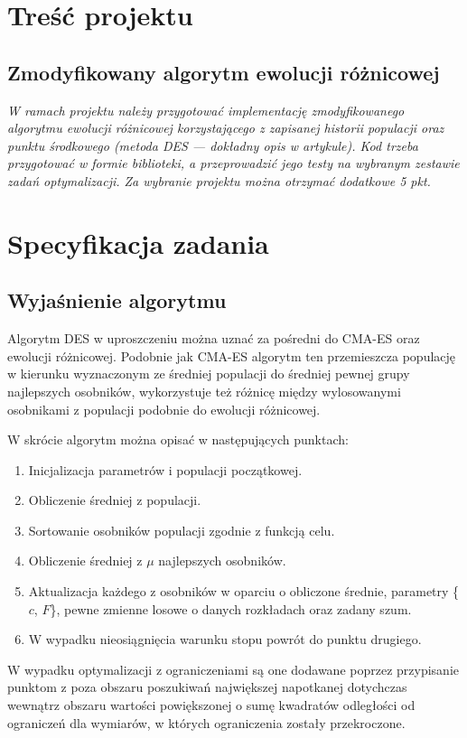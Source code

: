 \chapter{Treść projektu}
\section{Zmodyfikowany algorytm ewolucji różnicowej}
\textit{W ramach projektu należy przygotować implementację zmodyfikowanego algorytmu ewolucji różnicowej korzystającego z zapisanej historii populacji oraz punktu środkowego (metoda DES --- dokładny opis w artykule). Kod trzeba przygotować w formie biblioteki, a przeprowadzić jego testy na wybranym zestawie zadań optymalizacji. Za wybranie projektu można otrzymać dodatkowe 5 pkt.}

\chapter{Specyfikacja zadania}
\section{Wyjaśnienie algorytmu}
Algorytm DES w uproszczeniu można uznać za pośredni do CMA-ES oraz ewolucji różnicowej. Podobnie jak CMA-ES algorytm ten przemieszcza populację w kierunku wyznaczonym ze średniej populacji do średniej pewnej grupy najlepszych osobników, wykorzystuje też różnicę między wylosowanymi osobnikami z populacji podobnie do ewolucji różnicowej.

W skrócie algorytm można opisać w następujących punktach:

\begin{enumerate}
    \item Inicjalizacja parametrów i populacji początkowej.
    \item Obliczenie średniej z populacji.
    \item Sortowanie osobników populacji zgodnie z funkcją celu.
    \item Obliczenie średniej z $\mu$ najlepszych osobników.
    \item Aktualizacja każdego z osobników w oparciu o obliczone średnie, parametry \{$c$, $F$\}, pewne zmienne losowe o danych rozkładach oraz zadany szum.
    \item W wypadku nieosiągnięcia warunku stopu powrót do punktu drugiego.
\end{enumerate}

W wypadku optymalizacji z ograniczeniami są one dodawane poprzez przypisanie punktom z poza obszaru poszukiwań największej napotkanej dotychczas wewnątrz obszaru wartości powiększonej o sumę kwadratów odległości od ograniczeń dla wymiarów, w których ograniczenia zostały przekroczone.

